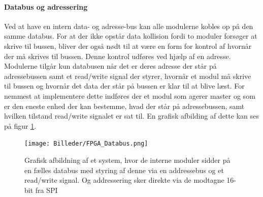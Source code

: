 \paragraph*{Databus og adressering}
Ved at have en intern data- og adresse-bus kan alle modulerne kobles op på den samme databus. For at der ikke opstår data kollision fordi to moduler forsøger at skrive til bussen, bliver der også nødt til at være en form for kontrol af hvornår der må skrives til bussen. Denne kontrol udføres ved hjælp af en adresse. Modulerne tilgår kun databusen når det er deres adresse der står på adressebussen samt et read/write signal der styrer, hvornår et modul må skrive til bussen og hvornår det data der står på bussen er klar til at blive læst. For nemmest at implementere dette indføres der et modul som agerer master og som er den eneste enhed der kan bestemme, hvad der står på adressebussen, samt hvilken tilstand read/write signalet er sat til. En grafisk afbilding af dette kan ses på figur \ref{fig:FPGA_Databus}.

\begin{figure}[ht]
	\begin{center}
		\texttt{[image: Billeder/FPGA\_Databus.png]}
	\end{center}
\caption{Grafisk afbildning af et system, hvor de interne moduler sidder på en fælles databus med styring af denne via en addressebus og et read/write signal. Og addressering sker direkte via de modtagne 16-bit fra SPI}
\label{fig:FPGA_Databus}
\end{figure}

